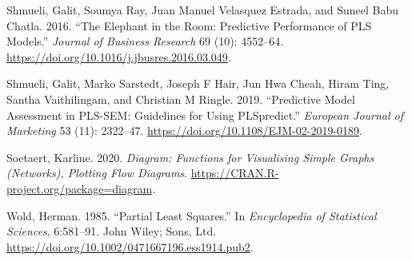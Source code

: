 \begin{CSLReferences}{1}{0}
\leavevmode{}%
Shmueli, Galit, Soumya Ray, Juan Manuel Velasquez Estrada, and Suneel Babu Chatla. 2016. {``The Elephant in the Room: Predictive Performance of PLS Models.''} \emph{Journal of Business Research} 69 (10): 4552--64. \url{https://doi.org/10.1016/j.jbusres.2016.03.049}.

\leavevmode{}%
Shmueli, Galit, Marko Sarstedt, Joseph F Hair, Jun Hwa Cheah, Hiram Ting, Santha Vaithilingam, and Christian M Ringle. 2019. {``Predictive Model Assessment in PLS-SEM: Guidelines for Using PLSpredict.''} \emph{European Journal of Marketing} 53 (11): 2322--47. \url{https://doi.org/10.1108/EJM-02-2019-0189}.

\leavevmode{}%
Soetaert, Karline. 2020. \emph{Diagram: Functions for Visualising Simple Graphs (Networks), Plotting Flow Diagrams}. \url{https://CRAN.R-project.org/package=diagram}.

\leavevmode{}%
Wold, Herman. 1985. {``Partial Least Squares.''} In \emph{Encyclopedia of Statistical Sciences}, 6:581--91. John Wiley; Sons, Ltd. \url{https://doi.org/10.1002/0471667196.ess1914.pub2}.

\end{CSLReferences}


\address{%
Giuseppe Lamberti,\\
Department of Business,\\%
Universitat Autonoma de Barcelona UAB,\\ Spain.\\ \url{http://orcid.org/0000-0002-8666-796X}\\
%
%
%
\href{mailto:giuseppe.lamberti@uab.cat}{\nolinkurl{giuseppe.lamberti@uab.cat}}%
}
